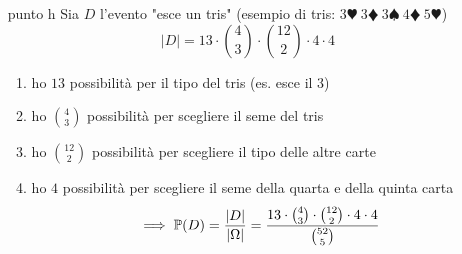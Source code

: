 \begin{enumerate}
\begin{enumerate}
	\end{enumerate}
	\item [punto h] Sia $D$ l'evento "esce un tris" (esempio di tris: $3\varheartsuit \ 3\vardiamondsuit \ 3\spadesuit \ 4\vardiamondsuit \ 5\varheartsuit $)
	\begin{equation*}
		| D| =13\cdot \binom{4}{3} \cdot \binom{12}{2} \cdot 4\cdot 4
	\end{equation*}
	\begin{enumerate}
		\item ho $13$ possibilità per il tipo del tris (es. esce il $3$)
		\item ho $\binom{4}{3}$ possibilità per scegliere il seme del tris
		\item ho $\binom{12}{2}$ possibilità per scegliere il tipo delle altre carte
		\item ho $4$ possibilità per scegliere il seme della quarta e della quinta carta
		\begin{equation*}
			\implies \mathbb{P}(D) =\frac{| D| }{| \Omega | } =\frac{13\cdot \binom{4}{3} \cdot \binom{12}{2} \cdot 4\cdot 4}{\binom{52}{5}}
		\end{equation*}
	\end{enumerate}
\end{enumerate}